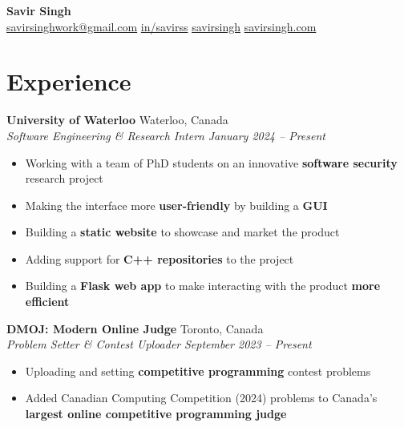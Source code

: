 \documentclass[a4paper,10pt]{article}
\begin{document}
\renewcommand{\labelitemi}{\tiny\textbullet}
\begin{center}
    \textbf{\huge Savir Singh}\\
    \vspace{1ex}
    \faEnvelope \hspace{0.5ex} \href{mailto:savirsinghwork@gmail.com}{savirsinghwork@gmail.com} \hspace{2ex}
    \faLinkedin \hspace{0.5ex} \href{https://www.linkedin.com/in/savirss}{in/savirss} \hspace{2ex}
    \faGithub \hspace{0.5ex} \href{https://github.com/savirsingh}{savirsingh} \hspace{2ex}
    \faGlobe \hspace{0.5ex} \href{https://www.savirsingh.com}{savirsingh.com}
\end{center}

\section*{Experience}
\textbf{University of Waterloo} \hfill Waterloo, Canada\\
\textit{Software Engineering \& Research Intern} \hfill \textit{January 2024 -- Present}
\begin{itemize}
    \item Working with a team of PhD students on an innovative \textbf{software security} research project
    \item Making the interface more \textbf{user-friendly} by building a \textbf{GUI}
    \item Building a \textbf{static website} to showcase and market the product
    \item Adding support for \textbf{C++ repositories} to the project
    \item Building a \textbf{Flask web app} to make interacting with the product \textbf{more efficient}
\end{itemize}

\medskip

\textbf{DMOJ: Modern Online Judge} \hfill Toronto, Canada\\
\textit{Problem Setter \& Contest Uploader} \hfill \textit{September 2023 -- Present}
\begin{itemize}
    \item Uploading and setting \textbf{competitive programming} contest problems
    \item Added Canadian Computing Competition (2024) problems to Canada's \textbf{largest online competitive programming judge}
\end{itemize}
\end{document}
